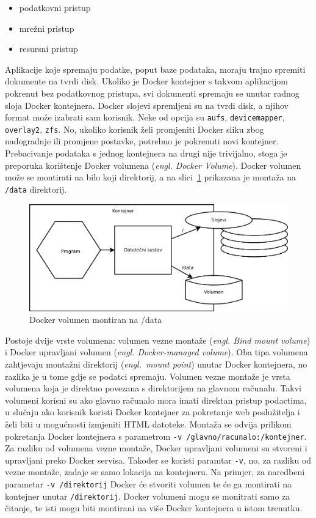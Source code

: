 \begin{itemize}
        \item podatkovni pristup
        \item mrežni pristup
        \item resursni pristup
\end{itemize}

Aplikacije koje spremaju podatke, poput baze podataka, moraju trajno spremiti dokumente na tvrdi
disk. Ukoliko je Docker kontejner s takvom aplikacijom pokrenut bez podatkovnog pristupa, svi
dokumenti spremaju se unutar radnog sloja Docker kontejnera. Docker slojevi spremljeni su na tvrdi
disk, a njihov format može izabrati sam korisnik. Neke od opcija su \texttt{aufs},
\texttt{devicemapper}, \texttt{overlay2}, \texttt{zfs}. No, ukoliko korisnik želi promjeniti Docker
sliku zbog nadogradnje ili promjene postavke, potrebno je pokrenuti novi kontejner. Prebacivanje
podataka s jednog kontejnera na drugi nije trivijalno, stoga je preporuka korištenje Docker volumena
(\textit{engl. Docker Volume}). Docker volumen može se montirati na bilo koji direktorij, a na
slici~\ref{fig:02docker_volume} prikazana je montaža na \texttt{/data} direktorij.

\begin{figure}[h]
    \centering
    \includegraphics[width=\textwidth]{img/02/docker_volume.png}
    \caption{Docker volumen montiran na /data}%
    \label{fig:02docker_volume}
\end{figure}

Postoje dvije vrste volumena: volumen vezne montaže (\textit{engl. Bind mount volume}) i Docker
upravljani volumen (\textit{engl. Docker-managed volume}). Oba tipa volumena zahtjevaju montažni
direktorij (\textit{engl.~mount point}) unutar Docker kontejnera, no razlika je u tome gdje se
podatci spremaju. Volumen vezne montaže je vrsta volumena koja je direktno povezana s direktorijem
na glavnom računalu. Takvi volumeni korisni su ako glavno računalo mora imati direktan pristup
podactima, u slučaju ako korisnik koristi Docker kontejner za pokretanje web poslužitelja i želi
biti u mogućnosti izmjeniti HTML datoteke. Montaža se odvija prilikom pokretanja Docker kontejnera s
parametrom \texttt{-v /glavno/racunalo:/kontejner}. Za razliku od volumena vezne montaže, Docker
upravljani volumeni su stvoreni i upravljani preko Docker servisa. Također se koristi paramtar
\texttt{-v}, no, za razliku od vezne montaže, zadaje se samo lokacija na kontejneru. Na primjer, za
naredbeni parametar \texttt{-v /direktorij} Docker će stvoriti volumen te će ga montirati na
kontejner unutar \texttt{/direktorij}. Docker volumeni mogu se monitrati samo za čitanje, te isti
mogu biti montirani na više Docker kontejnera u istom trenutku.

